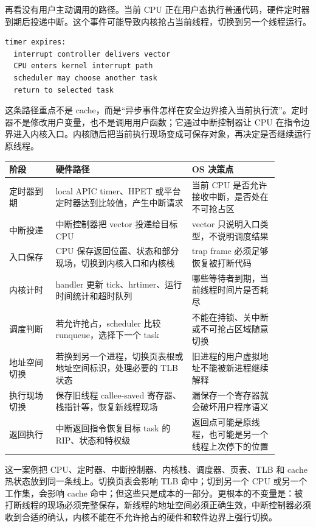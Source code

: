 再看没有用户主动调用的路径。当前 CPU 正在用户态执行普通代码，硬件定时器到期后投递中断。这个事件可能导致内核抢占当前线程，切换到另一个线程运行。

\begin{lstlisting}
timer expires:
  interrupt controller delivers vector
  CPU enters kernel interrupt path
  scheduler may choose another task
  return to selected task
\end{lstlisting}

这条路径重点不是 cache，而是“异步事件怎样在安全边界接入当前执行流”。定时器不是修改用户变量，也不是调用用户函数；它通过中断控制器让 CPU 在指令边界进入内核入口。内核随后把当前执行现场变成可保存对象，再决定是否继续运行原线程。

\begin{longtable}{p{0.15\linewidth}p{0.44\linewidth}p{0.29\linewidth}}
\toprule
阶段 & 硬件路径 & OS 决策点 \\
\midrule
定时器到期 & local APIC timer、HPET 或平台定时器达到比较值，产生中断请求 & 当前 CPU 是否允许接收中断，是否处在不可抢占区 \\
中断投递 & 中断控制器把 vector 投递给目标 CPU & vector 只说明入口类型，不说明调度结果 \\
入口保存 & CPU 保存返回位置、状态和部分现场，切换到内核入口和内核栈 & trap frame 必须足够恢复被打断代码 \\
内核计时 & handler 更新 tick、hrtimer、运行时间统计和超时队列 & 哪些等待者到期，当前线程时间片是否耗尽 \\
调度判断 & 若允许抢占，scheduler 比较 runqueue，选择下一个 task & 不能在持锁、关中断或不可抢占区域随意切换 \\
地址空间切换 & 若换到另一个进程，切换页表根或地址空间标识，处理必要的 TLB 状态 & 旧进程的用户虚拟地址不能被新进程继续解释 \\
执行现场切换 & 保存旧线程 callee-saved 寄存器、栈指针等，恢复新线程现场 & 漏保存一个寄存器就会破坏用户程序语义 \\
返回执行 & 中断返回指令恢复目标 task 的 RIP、状态和特权级 & 返回点可能是原线程，也可能是另一个线程上次停下的位置 \\
\bottomrule
\end{longtable}

这一案例把 CPU、定时器、中断控制器、内核栈、调度器、页表、TLB 和 cache 热状态放到同一条线上。切换页表会影响 TLB 命中；切到另一个 CPU 或另一个工作集，会影响 cache 命中；但这些只是成本的一部分。更根本的不变量是：被打断线程的现场必须完整保存，新线程的地址空间必须正确生效，中断控制器必须收到合适的确认，内核不能在不允许抢占的硬件和软件边界上强行切换。

